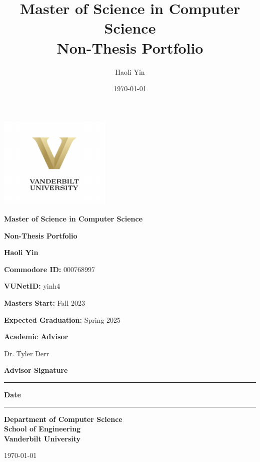 \documentclass[12pt,letterpaper]{report}
\title{Master of Science in Computer Science\\Non-Thesis Portfolio}
\author{Haoli Yin}
\date{\today}
\begin{document}
\begin{titlepage}
    \centering
    \vspace*{1cm}
    {\includegraphics[width=0.4\textwidth]{vanderbilt_logo.pdf}\par}
    \vspace{1.5cm}
    {\Huge\bfseries Master of Science in Computer Science\par}
    \vspace{1cm}
    {\Huge\bfseries Non-Thesis Portfolio\par}
    \vspace{2cm}
    {\Large\textbf{Haoli Yin}\par}
    \vspace{0.5cm}
    {\large\textbf{Commodore ID: }000768997\par}
    \vspace{0.5cm}
    {\large\textbf{VUNetID: }yinh4\par}
    \vspace{0.5cm}
    {\large\textbf{Masters Start:} Fall 2023\par}
    \vspace{0.5cm}
    {\large\textbf{Expected Graduation:} Spring 2025\par}
    \clearpage
    \vspace{2cm}
    {\large\textbf{Academic Advisor}\par}
    \vspace{0.5cm}
    {\large Dr. Tyler Derr\par}
    \vspace{2cm}
    {\large\textbf{Advisor Signature}\par}
    \vspace{0.5cm}
    \begin{center}
        \rule{8cm}{0.4pt}
    \end{center}
    \vspace{1cm}
    {\large\textbf{Date}\par}
    \vspace{0.5cm}
    \begin{center}
        \rule{8cm}{0.4pt}
    \end{center}
    \vspace{3cm}
    {\large\textbf{Department of Computer Science}\\
    \textbf{School of Engineering}\\
    \textbf{Vanderbilt University}\par}
    \vspace{1cm}
    {\large\today\par}
\end{titlepage}
\end{document}
